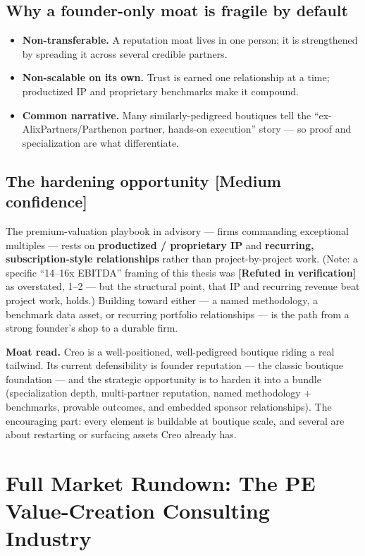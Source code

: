 \documentclass[11pt]{article}
\newcommand{\medium}{\textcolor{orange!80!black}{\textbf{[Medium confidence]}}}
\newcommand{\refuted}{\textcolor{red!75!black}{\textbf{[Refuted in verification]}}}
\begin{document}
\subsection{Why a founder-only moat is fragile by default}
\begin{itemize}
  \item \textbf{Non-transferable.} A reputation moat lives in one person; it is
  strengthened by spreading it across several credible partners.
  \item \textbf{Non-scalable on its own.} Trust is earned one relationship at a
  time; productized IP and proprietary benchmarks make it compound.
  \item \textbf{Common narrative.} Many similarly-pedigreed boutiques tell the
  ``ex-AlixPartners/Parthenon partner, hands-on execution'' story --- so proof
  and specialization are what differentiate.
\end{itemize}

\subsection{The hardening opportunity \medium}
The premium-valuation playbook in advisory --- firms commanding exceptional
multiples --- rests on \textbf{productized / proprietary IP} and
\textbf{recurring, subscription-style relationships} rather than
project-by-project work. (Note: a specific ``14--16x EBITDA'' framing of this
thesis was \refuted{} as overstated, 1--2 --- but the structural point, that IP
and recurring revenue beat project work, holds.) Building toward either ---
a named methodology, a benchmark data asset, or recurring portfolio
relationships --- is the path from a strong founder's shop to a durable firm.

\begin{takeaway}
\textbf{Moat read.} Creo is a well-positioned, well-pedigreed boutique riding a
real tailwind. Its current defensibility is founder reputation --- the classic
boutique foundation --- and the strategic opportunity is to harden it into a
bundle (specialization depth, multi-partner reputation, named methodology +
benchmarks, provable outcomes, and embedded sponsor relationships). The
encouraging part: every element is buildable at boutique scale, and several are
about restarting or surfacing assets Creo already has.
\end{takeaway}

\section{Full Market Rundown: The PE Value-Creation Consulting Industry}
\end{document}
